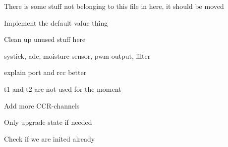 
\begin{DoxyRefList}
\item[\label{todo__todo000001}%
\hypertarget{todo__todo000001}{}%
File \hyperlink{hw_8h}{hw.h} ]There is some stuff not belonging to this file in here, it should be moved 
\item[\label{todo__todo000002}%
\hypertarget{todo__todo000002}{}%
global\+Scope$>$ Member \hyperlink{hw_8h_a3c02952100e7d051b77cdf060ca0ba9ba45012c00c17031e71a4f60ada04df07d}{H\+W\+\_\+\+I\+N\+I\+T\+\_\+\+P\+R\+E\+\_\+\+N\+V\+I\+C} ]Implement the default value thing  
\item[\label{todo__todo000004}%
\hypertarget{todo__todo000004}{}%
Member \hyperlink{structirrigation__controller__status_ab795e232c4e2d405b11e24312a6163c3}{irrigation\+\_\+controller\+\_\+status\+:\+:last\+\_\+hot\+\_\+sample} ]Clean up unused stuff here  
\item[\label{todo__todo000005}%
\hypertarget{todo__todo000005}{}%
File \hyperlink{main_8c}{main.c} ]systick, adc, moisture sensor, pwm output, filter 

explain port and rcc better 
\item[\label{todo__todo000003}%
\hypertarget{todo__todo000003}{}%
global\+Scope$>$ Member \hyperlink{irrigation_8h_a9891f6b3b37611d2aebdb8601acdf6c6a4460d045ceb966a377b72d2825606fbd}{moisture\+\_\+sensor\+\_\+t1} ]t1 and t2 are not used for the moment  
\item[\label{todo__todo000006}%
\hypertarget{todo__todo000006}{}%
global\+Scope$>$ Member \hyperlink{timer_8h_a995539ac62815c22bad2313f304865b5}{timer\+\_\+ccr\+\_\+init} (struct \hyperlink{structtimer__ccr}{timer\+\_\+ccr} $\ast$ccr, enum hw\+\_\+init\+\_\+state state)]Add more C\+C\+R-\/channels 

Only upgrade state if needed  
\item[\label{todo__todo000008}%
\hypertarget{todo__todo000008}{}%
global\+Scope$>$ Member \hyperlink{usart_8c_a0e3103fc345dfb09aa255989c86805e8}{usart\+\_\+init} (struct usart $\ast$usart, enum hw\+\_\+init\+\_\+state state)]Check if we are inited already 
\end{DoxyRefList}